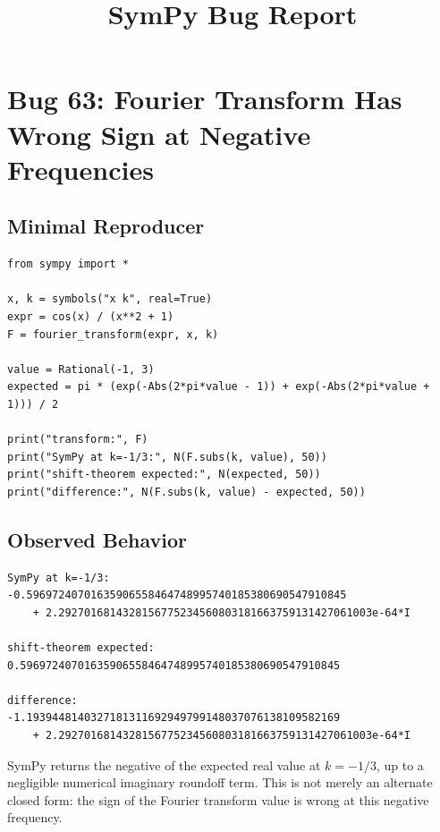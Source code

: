 \documentclass[11pt]{article}
\title{SymPy Bug Report}
\author{}
\date{}
\begin{document}
\maketitle

\section{Bug 63: Fourier Transform Has Wrong Sign at Negative Frequencies}

\subsection{Minimal Reproducer}

\medskip

\begin{lstlisting}[style=bugpython]
from sympy import *

x, k = symbols("x k", real=True)
expr = cos(x) / (x**2 + 1)
F = fourier_transform(expr, x, k)

value = Rational(-1, 3)
expected = pi * (exp(-Abs(2*pi*value - 1)) + exp(-Abs(2*pi*value + 1))) / 2

print("transform:", F)
print("SymPy at k=-1/3:", N(F.subs(k, value), 50))
print("shift-theorem expected:", N(expected, 50))
print("difference:", N(F.subs(k, value) - expected, 50))
\end{lstlisting}

\subsection{Observed Behavior}

\medskip

\begin{lstlisting}[style=bugpython]
SymPy at k=-1/3:
-0.59697240701635906558464748995740185380690547910845
    + 2.2927016814328156775234560803181663759131427061003e-64*I

shift-theorem expected:
0.59697240701635906558464748995740185380690547910845

difference:
-1.1939448140327181311692949799148037076138109582169
    + 2.2927016814328156775234560803181663759131427061003e-64*I
\end{lstlisting}

SymPy returns the negative of the expected real value at \(k=-1/3\), up to a
negligible numerical imaginary roundoff term. This is not merely an alternate
closed form: the sign of the Fourier transform value is wrong at this negative
frequency.
\end{document}
